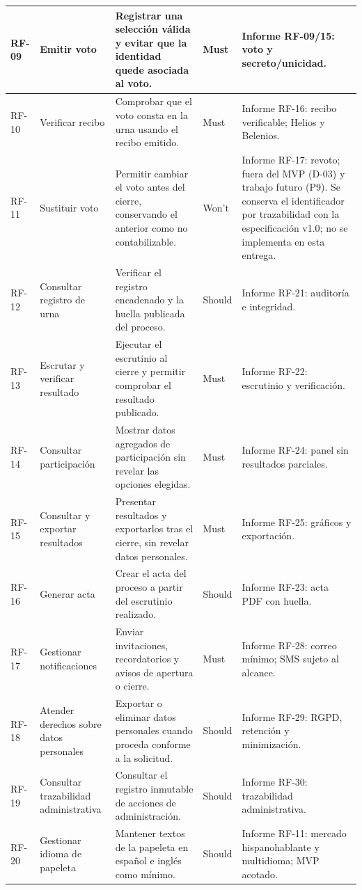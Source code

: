 \begin{longtable}{|p{}|p{}|p{}|p{}|p{}|}
\hline
RF-09 & Emitir voto & Registrar una selección válida y evitar que la identidad quede asociada al voto. & Must & Informe RF-09/15: voto y secreto/unicidad. \\
\hline
RF-10 & Verificar recibo & Comprobar que el voto consta en la urna usando el recibo emitido. & Must & Informe RF-16: recibo verificable; Helios y Belenios. \\
\hline
RF-11 & Sustituir voto & Permitir cambiar el voto antes del cierre, conservando el anterior como no contabilizable. & Won't & Informe RF-17: revoto; fuera del MVP (D-03) y trabajo futuro (P9). Se conserva el identificador por trazabilidad con la especificación v1.0; no se implementa en esta entrega. \\
\hline
RF-12 & Consultar registro de urna & Verificar el registro encadenado y la huella publicada del proceso. & Should & Informe RF-21: auditoría e integridad. \\
\hline
RF-13 & Escrutar y verificar resultado & Ejecutar el escrutinio al cierre y permitir comprobar el resultado publicado. & Must & Informe RF-22: escrutinio y verificación. \\
\hline
RF-14 & Consultar participación & Mostrar datos agregados de participación sin revelar las opciones elegidas. & Must & Informe RF-24: panel sin resultados parciales. \\
\hline
RF-15 & Consultar y exportar resultados & Presentar resultados y exportarlos tras el cierre, sin revelar datos personales. & Must & Informe RF-25: gráficos y exportación. \\
\hline
RF-16 & Generar acta & Crear el acta del proceso a partir del escrutinio realizado. & Should & Informe RF-23: acta PDF con huella. \\
\hline
RF-17 & Gestionar notificaciones & Enviar invitaciones, recordatorios y avisos de apertura o cierre. & Must & Informe RF-28: correo mínimo; SMS sujeto al alcance. \\
\hline
RF-18 & Atender derechos sobre datos personales & Exportar o eliminar datos personales cuando proceda conforme a la solicitud. & Should & Informe RF-29: RGPD, retención y minimización. \\
\hline
RF-19 & Consultar trazabilidad administrativa & Consultar el registro inmutable de acciones de administración. & Should & Informe RF-30: trazabilidad administrativa. \\
\hline
RF-20 & Gestionar idioma de papeleta & Mantener textos de la papeleta en español e inglés como mínimo. & Should & Informe RF-11: mercado hispanohablante y multidioma; MVP acotado. \\

\end{longtable}
